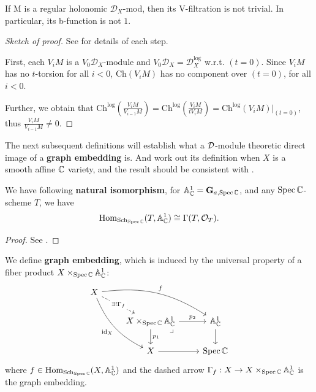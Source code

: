 \begin{theorem}\label{thm:V-filtration_of_RH_D-module_is_not_trivial}
    If M is a regular holonomic $\mathcal{D}_X$-mod, then its V-filtration is not trivial. In particular, its b-function is not $1$.
\end{theorem}

\begin{proof}[Sketch of proof]

    See \cite{Wu2021CharacteristicCyclesHolonomicDmodules} for details of each step.

    First, each $V_i M$ is a $V_0 \mathcal{D}_X$-module and $V_0 \mathcal{D}_X = \mathcal{D}_X^{\log}$ w.r.t. $(t = 0)$. Since $V_i M$ has no $t$-torsion for all $i < 0$, $\mathrm{Ch}(V_i M)$ has no component over $(t = 0)$, for all $i < 0$.

    Further, we obtain that $\mathrm{Ch}^{\log}\left(\frac{V_i M}{V_{i-1} M}\right) = \mathrm{Ch}^{\log}\left(\frac{V_i M}{t V_i M}\right)= \mathrm{Ch}^{\log}(V_i M)\big|_{(t=0)}$, thus $\frac{V_i M}{V_{i-1} M} \neq 0.$

\end{proof}

The next subsequent definitions will establish what a $\mathcal{D}$-module theoretic direct image of a \textbf{graph embedding} is.
And work out its definition when $X$ is a smooth affine $\mathbb{C}$ variety, and the result should be consistent with \cite[discussion above Prop.~1.4]{Budur04}.

\begin{proposition}\label{prop:functor_of_points}
    We have following \textbf{natural isomorphism}, for $\mathbb{A}^1_{\mathbb{C}} = \mathbf{G}_{a,\operatorname{Spec}\mathbb{C}}$, and any $\operatorname{Spec}\mathbb{C}$-scheme $T$, we have
    \[
        \operatorname{Hom}_{\mathrm{Sch}_{\operatorname{Spec}\mathbb{C}}}(T , \mathbb{A}^1_{\mathbb{C}}) \cong \Gamma(T, \mathcal{O}_T).
    \]
\end{proposition}
\begin{proof}
    See \cite[\href{https://stacks.math.columbia.edu/tag/022V}{Tag 022V}]{stacks-project}.
\end{proof}

\begin{definition}\label{def:graph_embedding}
    We define \textbf{graph embedding}, which is induced by the universal property of a fiber product $X\times_{\operatorname{Spec}\mathbb{C}} \mathbb{A}^1_{\mathbb{C}}$:
    $$
        \begin{tikzcd}
            X \arrow[drr, "f", bend left=20] \arrow[ddr, "\operatorname{id}_X"', bend right=20] \arrow[dr, "\exists! \Gamma_f" description, dashed] & & \\
            & X \times_{\Spec\C} \mathbb{A}^1_{\C} \arrow[r, "p_2"] \arrow[d, "p_1"] \arrow[dr, phantom, "\lrcorner", very near start] & \mathbb{A}^1_{\C} \arrow[d] \\
            & X \arrow[r] & \Spec\C
        \end{tikzcd}
    $$
    where $f\in\operatorname{Hom}_{\mathrm{Sch}_{\operatorname{Spec}\mathbb{C}}}(X, \mathbb{A}^1_{\mathbb{C}})$ and the dashed arrow $\Gamma_f:X\to X\times_{\operatorname{Spec}\mathbb{C}}\mathbb{A}^1_{\mathbb{C}}$ is the graph embedding.
\end{definition}

